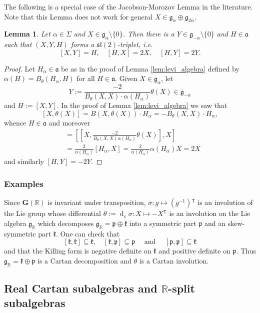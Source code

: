 \documentclass[12pt]{amsart}
\newcommand{\R}{\mathbb{R} }
\newcommand{\frakg}{\mathfrak{g}}
\newcommand{\frakp}{\mathfrak{p}}
\newcommand{\frakk}{\mathfrak{k}}
\newcommand{\fraka}{\mathfrak{a}}
\newcommand{\bG}{\mathbf{G}}
\newcommand{\tran}{{^{\mathsf{T}}\!}}
\numberwithin{equation}{section}
\newtheorem{lemma}[theorem]{Lemma}
\theoremstyle{remark} %
\begin{document}
The following is a special case of the Jacobson-Morozov Lemma in the literature. Note that this Lemma does not work for general $X\in \frakg_\alpha \oplus \frakg_{2\alpha}$.

\begin{lemma}\label{lem:JM_basic}
	Let $\alpha \in \Sigma$ and $X \in \frakg_\alpha \setminus \{0\}$. Then there is a $Y \in \frakg_{-\alpha} \setminus \{0\}$ and $H \in \fraka$ such that $(X,Y,H)$ forms a $\mathfrak{sl}(2)$-triplet, i.e.
	$$
	[X,Y] = H, \quad [H,X] = 2X,  \quad [H,Y]=2Y.
	$$
\end{lemma}
\begin{proof}
	Let $H_\alpha \in \fraka$ be as in the proof of Lemma \ref{lem:levi_algebra} defined by $\alpha(H) = B_{\theta}(H_\alpha,H)$ for all $H \in \fraka$. Given $X \in \frakg_\alpha$, let
	$$
	Y := \frac{-2}{B_{\theta}(X,X) \cdot \alpha(H_\alpha)} \theta(X) \in \frakg_{-\alpha}
	$$
	and $H:= [X,Y]$. In the proof of Lemma \ref{lem:levi_algebra} we saw that
	$$
	[X,\theta(X)] = B(X,\theta(X))\cdot H_\alpha = -B_{\theta}(X,X) \cdot H_\alpha,
	$$ 
	whence $H \in \fraka$ and moreover
	\begin{align*}
		[H,X] &= \left[\left[X,\frac{-2}{B_{\theta}(X,X)\alpha(H_\alpha)} \theta(X)\right],X\right] \\
		&= \frac{2}{\alpha(H_\alpha)} \left[H_\alpha,X\right] = \frac{2}{\alpha(H_\alpha)} \alpha(H_\alpha) X = 2X
	\end{align*}
	and similarly $[H,Y] = -2Y$.
\end{proof}


\subsubsection{Examples}
Since $\bG(\R)$ is invariant under transposition, $\sigma \colon g \mapsto (g^{-1})\tran$ is an involution of the Lie group whose differential $\theta := \operatorname{d}_e\! \sigma \colon X \mapsto -X\tran$ is an involution on the Lie algebra $\frakg_\R$ which decomposes $\frakg_\R= \frakp \oplus \frakk$ into a symmetric part $\frakp$ and an skew-symmetric part $\frakk$. One can check that
$$
[\frakk, \frakk] \subseteq \frakk, \quad [\frakk, \frakp] \subseteq \frakp  \quad \text{ and } \quad [\frakp, \frakp] \subseteq \frakk
$$
and that the Killing form is negative definite on $\frakk$ and positive definite on $\frakp$. Thus $\frakg_\R = \frakk \oplus \frakp$ is a Cartan decomposition and $\theta$ is a Cartan involution.

\subsection{Real Cartan subalgebras and $\R$-split subalgebras}\label{sec:real_cartan_split}
\end{document}

